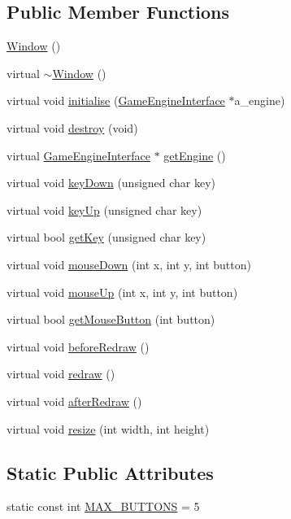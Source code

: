 \subsection*{Public Member Functions}
\begin{DoxyCompactItemize}
\item 
\hyperlink{classWindow_a74e6087da23d3c24e9fac0245e5ec92c}{Window} ()
\item 
virtual \hyperlink{classWindow_a62b4a97b3c2e492f1d9a46092011e2d9}{$\sim$\-Window} ()
\item 
virtual void \hyperlink{classWindow_a3dcd22169bd4d40f4b35eafdea31f6dd}{initialise} (\hyperlink{classGameEngineInterface}{Game\-Engine\-Interface} $\ast$a\-\_\-engine)
\item 
virtual void \hyperlink{classWindow_ae0ed7fd17df30f2d262cb684560e0469}{destroy} (void)
\item 
virtual \hyperlink{classGameEngineInterface}{Game\-Engine\-Interface} $\ast$ \hyperlink{classWindow_a55a6e31e36665bd3bcffcd844f5f0385}{get\-Engine} ()
\item 
virtual void \hyperlink{classWindow_a25a5308909ec422bebb480c803e1233c}{key\-Down} (unsigned char key)
\item 
virtual void \hyperlink{classWindow_a249f5a9513be00e59428a1df37502c63}{key\-Up} (unsigned char key)
\item 
virtual bool \hyperlink{classWindow_ac0927d0b89776959c4a95dd6737f841f}{get\-Key} (unsigned char key)
\item 
virtual void \hyperlink{classWindow_ace3bd5e6614510fce97263eccc35c0ab}{mouse\-Down} (int x, int y, int button)
\item 
virtual void \hyperlink{classWindow_a2e2c7592975405513a05a2da6a512b1c}{mouse\-Up} (int x, int y, int button)
\item 
virtual bool \hyperlink{classWindow_ab824bd52a5a055e468f7b2cc3d0b4f54}{get\-Mouse\-Button} (int button)
\item 
virtual void \hyperlink{classWindow_a1344118a395cb2fc48d4a2359372b074}{before\-Redraw} ()
\item 
virtual void \hyperlink{classWindow_aa8b52b7035a78ef960c194c9bb4a7c36}{redraw} ()
\item 
virtual void \hyperlink{classWindow_a05b1d6673e37db442ecd80c54d10e6b7}{after\-Redraw} ()
\item 
virtual void \hyperlink{classWindow_a6e4274c73728009132b7e0dfad42a8de}{resize} (int width, int height)
\end{DoxyCompactItemize}
\subsection*{Static Public Attributes}
\begin{DoxyCompactItemize}
\item 
static const int \hyperlink{classWindow_a78a36ba2259fdd12ad2cf3346430fb35}{M\-A\-X\-\_\-\-B\-U\-T\-T\-O\-N\-S} = 5
\end{DoxyCompactItemize}

